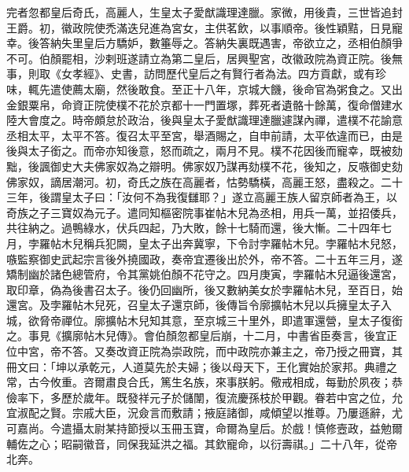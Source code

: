 \begin{pinyinscope}
 完者忽都皇后奇氏，高麗人，生皇太子愛猷識理達臘。家微，用後貴，三世皆追封王爵。初，徽政院使禿滿迭兒進為宮女，主供茗飲，以事順帝。後性穎黠，日見寵幸。後答納失里皇后方驕妒，數箠辱之。答納失裏既遇害，帝欲立之，丞相伯顏爭不可。伯顏罷相，沙剌班遂請立為第二皇后，居興聖宮，改徽政院為資正院。後無事，則取《女孝經》、史書，訪問歷代皇后之有賢行者為法。四方貢獻，或有珍味，輒先遣使薦太廟，然後敢食。至正十八年，京城大饑，後命官為粥食之。又出金銀粟帛，命資正院使樸不花於京都十一門置塚，葬死者遺骼十餘萬，復命僧建水陸大會度之。時帝頗怠於政治，後與皇太子愛猷識理達臘遽謀內禪，遣樸不花諭意丞相太平，太平不答。復召太平至宮，舉酒賜之，自申前請，太平依違而已，由是後與太子銜之。而帝亦知後意，怒而疏之，兩月不見。樸不花因後而寵幸，既被劾黜，後諷御史大夫佛家奴為之辯明。佛家奴乃謀再劾樸不花，後知之，反嗾御史劾佛家奴，謫居潮河。初，奇氏之族在高麗者，怙勢驕橫，高麗王怒，盡殺之。二十三年，後謂皇太子曰：「汝何不為我復讎耶？」遂立高麗王族人留京師者為王，以奇族之子三寶奴為元子。遣同知樞密院事崔帖木兒為丞相，用兵一萬，並招倭兵，共往納之。過鴨綠水，伏兵四起，乃大敗，餘十七騎而還，後大慚。二十四年七月，孛羅帖木兒稱兵犯闕，皇太子出奔冀寧，下令討孛羅帖木兒。孛羅帖木兒怒，嗾監察御史武起宗言後外撓國政，奏帝宜遷後出於外，帝不答。二十五年三月，遂矯制幽於諸色總管府，令其黨姚伯顏不花守之。四月庚寅，孛羅帖木兒逼後還宮，取印章，偽為後書召太子。後仍回幽所，後又數納美女於孛羅帖木兒，至百日，始還宮。及孛羅帖木兒死，召皇太子還京師，後傳旨令廓擴帖木兒以兵擁皇太子入城，欲脅帝禪位。廓擴帖木兒知其意，至京城三十里外，即遣軍還營，皇太子復銜之。事見《擴廓帖木兒傳》。會伯顏忽都皇后崩，十二月，中書省臣奏言，後宜正位中宮，帝不答。又奏改資正院為崇政院，而中政院亦兼主之，帝乃授之冊寶，其冊文曰：「坤以承乾元，人道莫先於夫婦；後以母天下，王化實始於家邦。典禮之常，古今攸重。咨爾肅良合氏，篤生名族，來事朕躬。儆戒相成，每勤於夙夜；恭儉率下，多歷於歲年。既發祥元子於儲闈，復流慶孫枝於甲觀。眷若中宮之位，允宜淑配之賢。宗戚大臣，況僉言而敷請；掖庭諸御，咸傾望以推尊。乃屢遜辭，尤可嘉尚。今遣攝太尉某持節授以玉冊玉寶，命爾為皇后。於戲！慎修壼政，益勉爾輔佐之心；昭嗣徽音，同保我延洪之福。其欽寵命，以衍壽祺。」二十八年，從帝北奔。



\end{pinyinscope}
